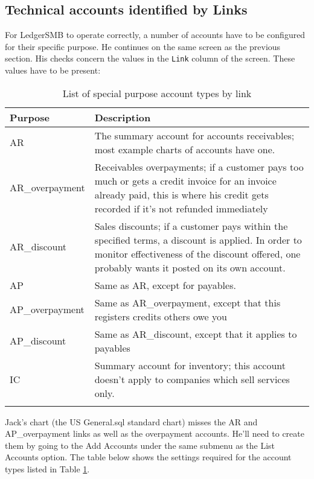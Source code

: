 \subsection{Technical accounts identified by Links}
\label{subsec-first-login-technical-accounts-links}

For LedgerSMB to operate correctly, a number of accounts have to be configured for
their specific purpose. He continues on the same screen as the previous section. His
checks concern the values in the \texttt{Link} column of the screen. These values have
to be present:

\begin{longtable}{ lp{8cm} }
Purpose & Description \\ \hline
\endhead
AR  & The summary account for accounts receivables; most example charts of accounts have one. \\
AR\_overpayment & Receivables overpayments; if a customer pays too much or gets a credit
                  invoice for an invoice already paid, this is where his credit gets
                  recorded if it's not refunded immediately \\
AR\_discount & Sales discounts; if a customer pays within the specified terms, a discount
                  is applied.
                  In order to monitor effectiveness of the discount offered, one probably
                  wants it posted on its own account. \\
AP  & Same as AR, except for payables. \\
AP\_overpayment  & Same as AR\_overpayment, except that this registers credits others owe you \\
AP\_discount &  Same as AR\_discount, except that it applies to payables \\
IC  & Summary account for inventory; this account doesn't apply to companies which sell
      services only. \\

\caption{List of special purpose account types by link}
\label{tbl:special-purpose-account-types-links}
\end{longtable}


Jack's chart (the US General.sql standard chart) misses the AR and AP\_overpayment links as
well as the overpayment accounts. He'll need to create them by going to the Add Accounts under
the same submenu as the List Accounts option. The table below shows the settings required for
the account types listed in Table \ref{tbl:special-purpose-account-types-links}.

